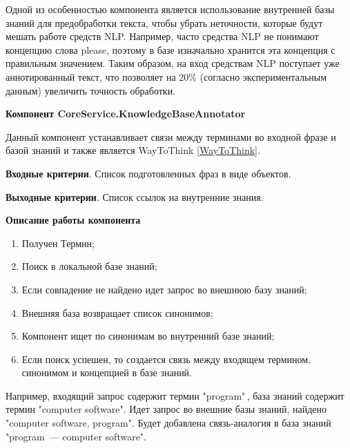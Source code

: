Одной из особенностью компонента является использование внутренней базы знаний для предобработки текста, чтобы убрать неточности, которые будут мешать работе средств NLP. Например, часто средства NLP не понимают концепцию слова please, поэтому в базе изначально хранится эта концепция с правильным значением. Таким образом, на вход средствам NLP поступает уже аннотированный текст, что позволяет на 20\% (согласно экспериментальным данным) увеличить точность обработки. \par
\textbf{Компонент CoreService.KnowledgeBaseAnnotator}\par 
Данный компонент устанавливает связи между терминами во входной фразе и базой знаний и также является WayToThink \ref{WayToThink}.  \par
\textbf{Входные критерии}. Список подготовленных фраз в виде объектов. \par
\textbf{Выходные критерии}. Список ссылок на внутренние знания. \par
\textbf{Описание работы компонента} \par
\begin{enumerate}
	\item Получен Термин;
	\item Поиск в локальной базе знаний;
	\item Если совпадение не найдено идет запрос во внешнюю базу знаний;
	\item Внешняя база возвращает список синонимов;
	\item Компонент ищет по синонимам во внутренний базе знаний;
	\item Если поиск успешен, то создается связь между входящем термином, синонимом и концепцией в базе знаний.
\end{enumerate}
Например, входящий запрос содержит термин "program"\,, база знаний содержит термин "computer software". Идет запрос во внешние базы знаний, найдено "computer software, program". Будет добавлена связь-аналогия в база знаний "program~--- computer software". 


